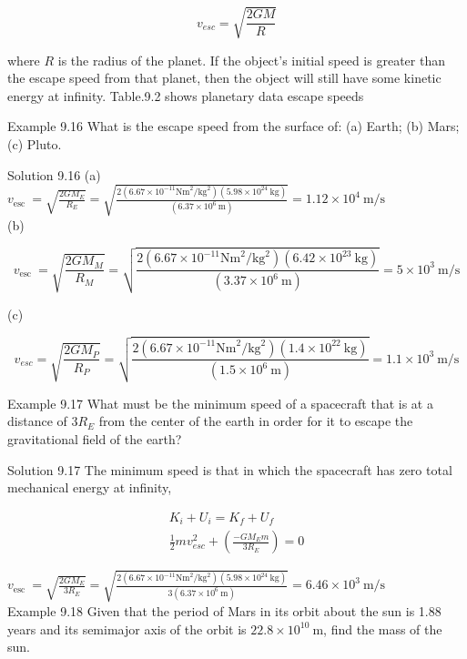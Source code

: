 \documentclass[10pt]{article}
\numberwithin{equation}{section}
\begin{document}
$$
v_{e s c}=\sqrt{\frac{2 G M}{R}}
$$

where $R$ is the radius of the planet. If the object's initial speed is greater than the escape speed from that planet, then the object will still have some kinetic energy at infinity. Table.9.2 shows planetary data escape speeds

Example 9.16 What is the escape speed from the surface of: (a) Earth; (b) Mars; (c) Pluto.

Solution 9.16 (a)\\
$v_{\text {esc }}=\sqrt{\frac{2 G M_{E}}{R_{E}}}=\sqrt{\frac{2\left(6.67 \times 10^{-11} \mathrm{Nm}^{2} / \mathrm{kg}^{2}\right)\left(5.98 \times 10^{24} \mathrm{~kg}\right)}{\left(6.37 \times 10^{6} \mathrm{~m}\right)}}=1.12 \times 10^{4} \mathrm{~m} / \mathrm{s}$\\
(b)

$$
v_{\text {esc }}=\sqrt{\frac{2 G M_{M}}{R_{M}}}=\sqrt{\frac{2\left(6.67 \times 10^{-11} \mathrm{Nm}^{2} / \mathrm{kg}^{2}\right)\left(6.42 \times 10^{23} \mathrm{~kg}\right)}{\left(3.37 \times 10^{6} \mathrm{~m}\right)}}=5 \times 10^{3} \mathrm{~m} / \mathrm{s}
$$

(c)

$$
v_{e s c}=\sqrt{\frac{2 G M_{P}}{R_{P}}}=\sqrt{\frac{2\left(6.67 \times 10^{-11} \mathrm{Nm}^{2} / \mathrm{kg}^{2}\right)\left(1.4 \times 10^{22} \mathrm{~kg}\right)}{\left(1.5 \times 10^{6} \mathrm{~m}\right)}}=1.1 \times 10^{3} \mathrm{~m} / \mathrm{s}
$$

Example 9.17 What must be the minimum speed of a spacecraft that is at a distance of $3 R_{E}$ from the center of the earth in order for it to escape the gravitational field of the earth?

Solution 9.17 The minimum speed is that in which the spacecraft has zero total mechanical energy at infinity,

$$
\begin{gathered}
K_{i}+U_{i}=K_{f}+U_{f} \\
\frac{1}{2} m v_{e s c}^{2}+\left(\frac{-G M_{E} m}{3 R_{E}}\right)=0
\end{gathered}
$$

$v_{\text {esc }}=\sqrt{\frac{2 G M_{E}}{3 R_{E}}}=\sqrt{\frac{2\left(6.67 \times 10^{-11} \mathrm{Nm}^{2} / \mathrm{kg}^{2}\right)\left(5.98 \times 10^{24} \mathrm{~kg}\right)}{3\left(6.37 \times 10^{6} \mathrm{~m}\right)}}=6.46 \times 10^{3} \mathrm{~m} / \mathrm{s}$\\
Example 9.18 Given that the period of Mars in its orbit about the sun is 1.88 years and its semimajor axis of the orbit is $22.8 \times 10^{10} \mathrm{~m}$, find the mass of the sun.
\end{document}

